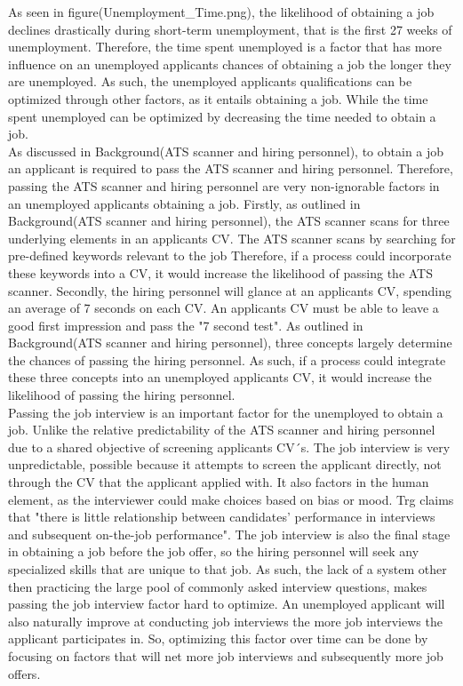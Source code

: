 As seen in figure(Unemployment_Time.png), the likelihood of obtaining a job declines drastically during short-term unemployment, that is the first 27 weeks of unemployment.
Therefore, the time spent unemployed is a factor that has more influence on an unemployed applicants chances of obtaining a job the longer they are unemployed.
As such, the unemployed applicants qualifications can be optimized through other factors, as it entails obtaining a job.
While the time spent unemployed can be optimized by decreasing the time needed to obtain a job. \\

As discussed in Background(ATS scanner and hiring personnel), to obtain a job an applicant is required to pass the ATS scanner and hiring personnel.
Therefore, passing the ATS scanner and hiring personnel are very non-ignorable factors in an unemployed applicants obtaining a job.
Firstly, as outlined in Background(ATS scanner and hiring personnel), the ATS scanner scans for three underlying elements in an applicants CV.
The ATS scanner scans by searching for pre-defined keywords relevant to the job
Therefore, if a process could incorporate these keywords into a CV, it would increase the likelihood of passing the ATS scanner.
Secondly, the hiring personnel will glance at an applicants CV, spending an average of 7 seconds on each CV.
An applicants CV must be able to leave a good first impression and pass the "7 second test".
As outlined in Background(ATS scanner and hiring personnel), three concepts largely determine the chances of passing the hiring personnel.
As such, if a process could integrate these three concepts into an unemployed applicants CV, it would increase the likelihood of passing the hiring personnel. \\

Passing the job interview is an important factor for the unemployed to obtain a job.
Unlike the relative predictability of the ATS scanner and hiring personnel due to a shared objective of screening applicants CV´s.
The job interview is very unpredictable, possible because it attempts to screen the applicant directly, not through the CV that the applicant applied with.
It also factors in the human element, as the interviewer could make choices based on bias or mood.
Trg claims that "there is little relationship between candidates’ performance in interviews and subsequent on-the-job performance".\cite{Job_Interview}
The job interview is also the final stage in obtaining a job before the job offer, so the hiring personnel will seek any specialized skills that are unique to that job.
As such, the lack of a system other then practicing the large pool of commonly asked interview questions, makes passing the job interview factor hard to optimize.\cite{Job_interview_common_questions}
An unemployed applicant will also naturally improve at conducting job interviews the more job interviews the applicant participates in.
So, optimizing this factor over time can be done by focusing on factors that will net more job interviews and subsequently more job offers. \\

